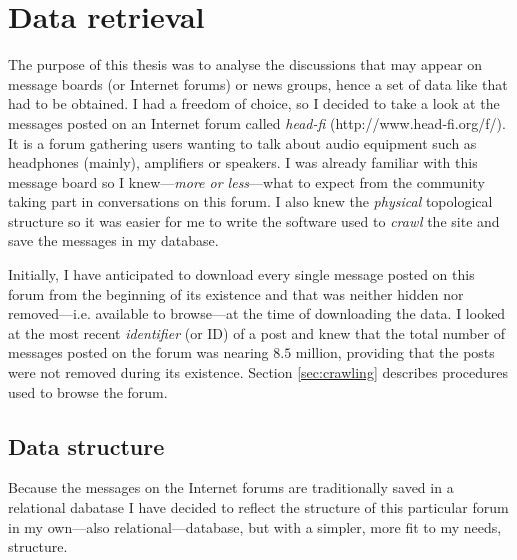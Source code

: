 \section{Data retrieval}

  The purpose of this thesis was to analyse the discussions that may appear on message boards (or Internet forums) or news groups, hence a set of data like that had to be obtained. I had a freedom of choice, so I decided to take a look at the messages posted on an Internet forum called \emph{head-fi} (http://www.head-fi.org/f/). It is a forum gathering users wanting to talk about audio equipment such as headphones (mainly), amplifiers or speakers. I was already familiar with this message board so I knew---\textit{more or less}---what to expect from the community taking part in conversations on this forum. I also knew the \emph{physical} topological structure so it was easier for me to write the software used to \emph{crawl} the site and save the messages in my database.
  
  Initially, I have anticipated to download every single message posted on this forum from the beginning of its existence and that was neither hidden nor removed---i.e. available to browse---at the time of downloading the data. I looked at the most recent \emph{identifier} (or ID) of a post and knew that the total number of messages posted on the forum was nearing $8.5$ million, providing that the posts were not removed during its existence. Section \ref{sec:crawling} describes procedures used to browse the forum.
  
  \subsection{Data structure}
    Because the messages on the Internet forums are traditionally saved in a relational dabatase I have decided to reflect the structure of this particular forum in my own---also relational---database, but with a simpler, more fit to my needs, structure.
    
